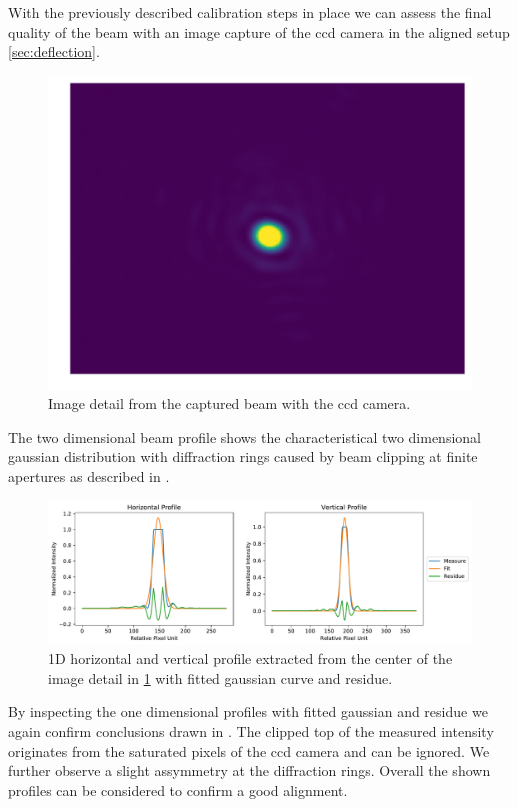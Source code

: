 With the previously described calibration steps in place we can assess the
final quality of the beam with an image capture of the \gls{ccd} camera in the
aligned setup \cref{sec:deflection}.

\begin{figure}[ht]
  \centering
  \includegraphics[width=.5\textwidth]{images/camera/profile2d.pdf}
  \caption{Image detail from the captured beam with the \gls{ccd} camera.}
  \label{fig:beamprofile:2d}
\end{figure}

The two dimensional beam profile shows the characteristical two dimensional
gaussian distribution with diffraction rings caused by beam clipping at
finite apertures as described in \cite{Hertlein2017}.

\begin{figure}[ht]
  \centering
  \includegraphics[width=\textwidth]{images/camera/profile1d.pdf}
  \caption{1D horizontal and vertical profile extracted from the center of
    the image detail in \cref{fig:beamprofile:2d} with fitted gaussian curve
  and residue.}
  \label{fig:beamprofile:1d}
\end{figure}

By inspecting the one dimensional profiles with fitted gaussian and residue
we again confirm conclusions drawn in \cite{Hertlein2017}. The clipped top
of the measured intensity originates from the saturated pixels of the
\gls{ccd} camera and can be ignored. We further observe a slight assymmetry
at the diffraction rings. Overall the shown profiles can be considered to
confirm a good alignment.
